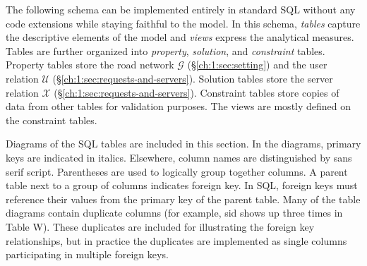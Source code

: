 The following schema can be implemented entirely in standard SQL without any
code extensions while staying faithful to the model.  In this schema,
\textit{tables} capture the descriptive elements of the model and
\textit{views} express the analytical measures.  Tables are further organized
into \emph{property}, \emph{solution}, and \emph{constraint} tables.  Property
tables store the road network $\mathcal{G}$ (\S\ref{ch:1:sec:setting}) and the user
relation $\mathcal{U}$ (\S\ref{ch:1:sec:requests-and-servers}).  Solution tables
store the server relation $\mathcal{X}$ (\S\ref{ch:1:sec:requests-and-servers}).
Constraint tables store copies of data from other tables for validation
purposes.  The views are mostly defined on the constraint tables.

Diagrams of the SQL tables are included in this section. In the diagrams,
primary keys are indicated in italics. Elsewhere, column names are
distinguished by \textsf{sans serif} script.  Parentheses are used to logically
group together columns.  A parent table next to a group of columns indicates
foreign key. In SQL, foreign keys must reference their values from the primary
key of the parent table. Many of the table diagrams contain duplicate columns
(for example, \textsf{sid} shows up three times in Table W).  These duplicates
are included for illustrating the foreign key relationships, but in practice
the duplicates are implemented as single columns participating in multiple
foreign keys.

